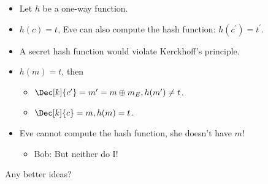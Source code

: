 \begin{frame}
  \begin{example}
    \begin{itemize}
      \item Let \(h\) be a one-way function.
        
        \pause{}
        
      \item \(h(c) = t\), Eve can also compute the hash function: \(h(c^\prime) 
          = t^\prime\).

        \pause{}

      \item A secret hash function would violate Kerckhoff's principle.

        \pause{}

      \item \(h(m) = t\), then
        \begin{itemize}
          \item \(\Dec[k]{c^\prime} = m^\prime = m\oplus m_E, h(m^\prime)\neq 
              t\).
          \item \(\Dec[k]{c} = m, h(m) = t\).
        \end{itemize}

        \pause{}
        
      \item Eve cannot compute the hash function, she doesn't have \(m\)!
        \pause{}
        \begin{itemize}
          \item Bob: But neither do I\@!
        \end{itemize}
    \end{itemize}
  \end{example}

  \pause{}

  \begin{exercise}
    Any better ideas?
  \end{exercise}
\end{frame}


